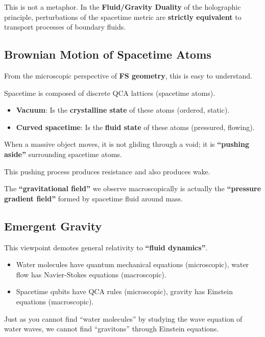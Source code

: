 This is not a metaphor. In the \textbf{Fluid/Gravity Duality} of the holographic principle, perturbations of the spacetime metric are \textbf{strictly equivalent} to transport processes of boundary fluids.

\subsection{Brownian Motion of Spacetime Atoms}

From the microscopic perspective of \textbf{FS geometry}, this is easy to understand.

Spacetime is composed of discrete QCA lattices (spacetime atoms).

\begin{itemize}
\item \textbf{Vacuum}: Is the \textbf{crystalline state} of these atoms (ordered, static).

\item \textbf{Curved spacetime}: Is the \textbf{fluid state} of these atoms (pressured, flowing).
\end{itemize}

When a massive object moves, it is not gliding through a void; it is \textbf{``pushing aside''} surrounding spacetime atoms.

This pushing process produces resistance and also produces wake.

The \textbf{``gravitational field''} we observe macroscopically is actually the \textbf{``pressure gradient field''} formed by spacetime fluid around mass.

\subsection{Emergent Gravity}

This viewpoint demotes general relativity to \textbf{``fluid dynamics''}.

\begin{itemize}
\item Water molecules have quantum mechanical equations (microscopic), water flow has Navier-Stokes equations (macroscopic).

\item Spacetime qubits have QCA rules (microscopic), gravity has Einstein equations (macroscopic).
\end{itemize}

Just as you cannot find ``water molecules'' by studying the wave equation of water waves, we cannot find ``gravitons'' through Einstein equations.

